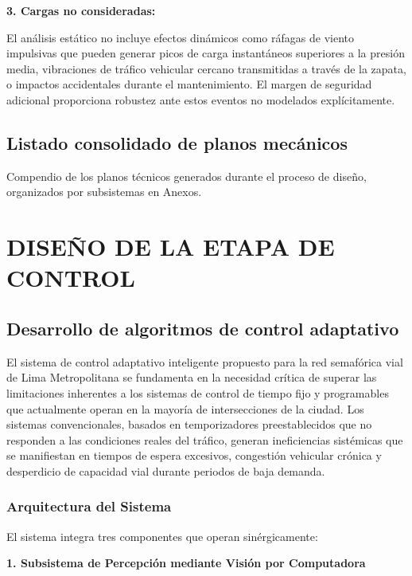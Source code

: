 \documentclass[12pt,a4paper,oneside]{report}
\begin{document}
\textbf{3. Cargas no consideradas:}

El análisis estático no incluye efectos dinámicos como ráfagas de viento impulsivas que pueden generar picos de carga instantáneos superiores a la presión media, vibraciones de tráfico vehicular cercano transmitidas a través de la zapata, o impactos accidentales durante el mantenimiento. El margen de seguridad adicional proporciona robustez ante estos eventos no modelados explícitamente.

\section{Listado consolidado de planos mecánicos}\label{listado-consolidado-de-planos-mecuxe1nicos}

Compendio de los planos técnicos generados durante el proceso de diseño, organizados por subsistemas en Anexos.

\chapter{DISEÑO DE LA ETAPA DE CONTROL}\label{capuxedtulo-6-diseuxf1o-de-la-etapa-de-control}

\section{Desarrollo de algoritmos de control adaptativo}\label{desarrollo-de-algoritmos-de-control-adaptativo}

El sistema de control adaptativo inteligente propuesto para la red semafórica vial de Lima Metropolitana se fundamenta en la necesidad crítica de superar las limitaciones inherentes a los sistemas de control de tiempo fijo y programables que actualmente operan en la mayoría de intersecciones de la ciudad. Los sistemas convencionales, basados en temporizadores preestablecidos que no responden a las condiciones reales del tráfico, generan ineficiencias sistémicas que se manifiestan en tiempos de espera excesivos, congestión vehicular crónica y desperdicio de capacidad vial durante periodos de baja demanda.

\subsection{Arquitectura del Sistema}\label{arquitectura-del-sistema}

El sistema integra tres componentes que operan sinérgicamente:

\textbf{1. Subsistema de Percepción mediante Visión por Computadora}
\end{document}
